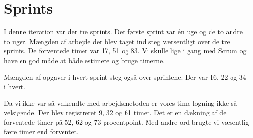 \section{Sprints}

I denne iteration var der tre sprints. Det første sprint var én uge og de to andre to uger.
Mængden af arbejde der blev taget ind steg værsentligt over de tre sprints. De forventede timer var 17, 51 og 83. Vi skulle lige i gang med Scrum og have en god måde at både estimere og bruge timerne.

Mængden af opgaver i hvert sprint steg også over sprintene. Der var 16, 22 og 34 i hvert.

Da vi ikke var så velkendte med arbejdsmetoden er vores time-logning ikke så velsigende. Der blev registreret 9, 32 og 61 timer. Det er en dækning af de forventede timer på 52, 62 og 73 procentpoint. Med andre ord brugte vi væsentlig fære timer end forventet.